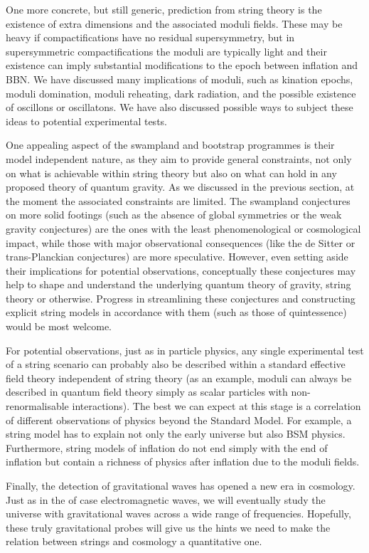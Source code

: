 One more concrete, but still generic, prediction from string theory is the existence of extra dimensions and the associated moduli fields. These may be heavy if compactifications have no residual supersymmetry, but in supersymmetric compactifications the moduli are typically light and their existence can imply substantial modifications to the epoch between inflation and BBN. We have discussed many implications of moduli, such as
 kination epochs, moduli domination, moduli reheating, dark radiation, and the possible existence of oscillons or oscillatons. We have also discussed possible ways to subject these ideas to potential experimental tests.

One appealing aspect of the swampland and bootstrap programmes is their model independent nature, as they aim to provide general 
constraints, not only on what is achievable within string theory but also on what can hold in any proposed theory of quantum gravity. As we discussed in the previous section, at the moment the associated constraints are limited.  The swampland conjectures on more solid footings 
(such as the absence of global symmetries or the weak gravity conjectures) are the ones with the least phenomenological or cosmological impact, while those with major observational consequences (like the de Sitter or trans-Planckian conjectures) are more speculative. However, even setting aside their implications for potential observations, conceptually these conjectures may help to shape and understand the underlying quantum theory of gravity, string theory or otherwise.  Progress in streamlining these conjectures and constructing
explicit string models in accordance with them (such as those of quintessence) would be most welcome.

For potential observations, just as in particle physics, any single experimental test of a string scenario can probably also be described within a standard effective field theory independent of string theory (as an example, moduli can always be described in quantum field theory simply as scalar particles with non-renormalisable interactions). The best we can expect at this stage is a correlation of different observations of physics beyond the Standard Model. For example, a string model has to explain not only the early universe but also BSM physics. Furthermore, string models of inflation do not end simply with the end of inflation but contain a richness of physics after inflation due to the moduli fields.   
  
 Finally, the detection of gravitational waves has opened a new era in cosmology. Just
 as in  the of case electromagnetic waves, we will eventually study the universe with gravitational waves across a wide range of frequencies.  Hopefully, these truly gravitational probes will give us the hints we need to make the relation between strings and cosmology a quantitative one.
 
